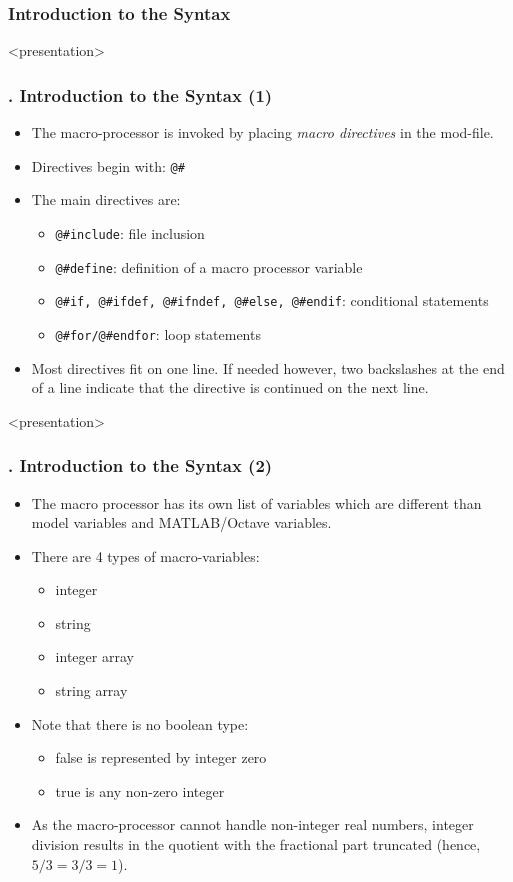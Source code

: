 \documentclass[11pt,aspectratio=169]{beamer}
\begin{document}
\subsubsection{Introduction to the Syntax}
\begin{frame}<presentation>
	\frametitle{{\thesection.\thesubsection\thinspace\thesubsubsection} Introduction to the Syntax (1)}
	\begin{itemize}
		\item The macro-processor is invoked by placing \textit{macro directives} in the mod-file. 
		\item Directives begin with: \texttt{@\#}  
		\item The main directives are:
		\begin{itemize}
			\item \texttt{@\#include}: file inclusion
			\item \texttt{@\#define}: definition of a macro processor variable
			\item \texttt{@\#if, @\#ifdef, @\#ifndef, @\#else, @\#endif}: conditional statements
			\item \texttt{@\#for/@\#endfor}: loop statements 
		\end{itemize}
	\item Most directives fit on one line. If needed however, two backslashes at the end of a line indicate that the directive is continued on the next line.
	\end{itemize}
\end{frame}
\begin{frame}<presentation>
	\frametitle{{\thesection.\thesubsection\thinspace\thesubsubsection} Introduction to the Syntax (2)}
	\begin{itemize}
		\item The macro processor has its own list of variables which are different than model variables and MATLAB/Octave variables.
		\item There are 4 types of macro-variables:
		\begin{itemize}
			\item integer 
			\item string 
			\item integer array 
			\item string array
		\end{itemize}
		\item Note that there is no boolean type:
		\begin{itemize}
			\item false is represented by integer zero
			\item true is any non-zero integer
		\end{itemize} 
		\item As the macro-processor cannot handle non-integer real numbers, integer division results in the quotient with the fractional part truncated (hence, $5/3=3/3=1$).
	\end{itemize}
\end{frame}
\end{document}
